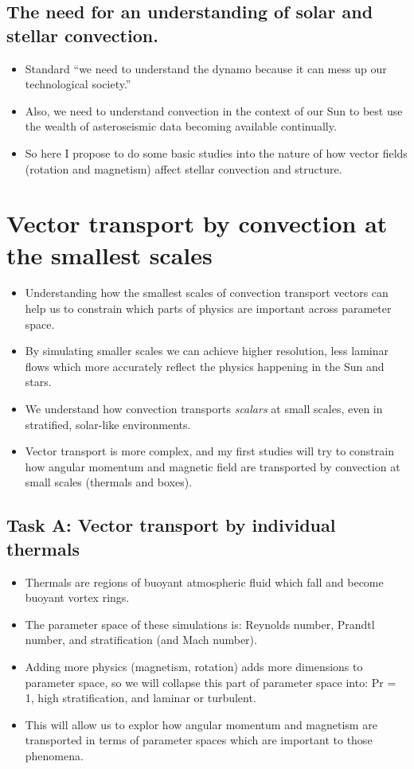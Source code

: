 \documentclass[aasms,12pt]{article}
\begin{document}
\subsection{The need for an understanding of solar and stellar convection.}

\begin{itemize}
\item Standard ``we need to understand the dynamo because it can mess up our technological society.''
\item Also, we need to understand convection in the context of our Sun to best use the wealth of asteroseismic data becoming available continually.
\item So here I propose to do some basic studies into the nature of how vector fields (rotation and magnetism) affect stellar convection and structure.
\end{itemize}

\section{Vector transport by convection at the smallest scales}
\begin{itemize}
\item Understanding how the smallest scales of convection transport vectors can help us to constrain which parts of physics are important across parameter space.
\item By simulating smaller scales we can achieve higher resolution, less laminar flows which more accurately reflect the physics happening in the Sun and stars.
\item We understand how convection transports \emph{scalars} at small scales, even in stratified, solar-like environments.
\item Vector transport is more complex, and my first studies will try to constrain how angular momentum and magnetic field are transported by convection at small scales (thermals and boxes).
\end{itemize}

\subsection{Task A: Vector transport by individual thermals}
\begin{itemize}
\item Thermals are regions of buoyant atmospheric fluid which fall and become buoyant vortex rings.
\item The parameter space of these simulations is: Reynolds number, Prandtl number, and stratification (and Mach number).
\item Adding more physics (magnetism, rotation) adds more dimensions to parameter space, so we will collapse this part of parameter space into: Pr = 1, high stratification, and laminar or turbulent.
\item This will allow us to explor how angular momentum and magnetism are transported in terms of parameter spaces which are important to those phenomena.
\end{itemize}
\end{document}
